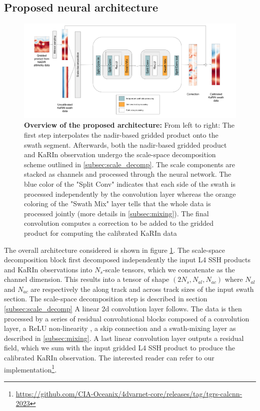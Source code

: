 \begin{bibunit}
\subsection{Proposed neural architecture}
\label{subsec:neural_arch}
\noindent
\begin{figure}
    \begin{center}
	    \includegraphics[width=\textwidth]{00_Calib/CalDiag2.png}
    \end{center}
    \caption{\textbf{Overview of the proposed architecture:} From left to right: The first step interpolates the nadir-based gridded product onto the swath segment. Afterwards, both the nadir-based gridded product and KaRIn observation undergo the scale-space decomposition scheme outlined in \ref{subsec:scale_decomp}. The scale components are stacked as channels and processed through the neural network. The blue color of the "Split Conv" indicates that each side of the swath is processed independently by the convolution layer whereas the orange coloring of the "Swath Mix" layer tells that the whole data is processed jointly (more details in \ref{subsec:mixing}). The final convolution computes a correction to be added to the gridded product for computing the calibrated KaRIn data}
    \label{fig:arch}	
\end{figure}
The overall architecture considered is shown in figure \ref{fig:arch}. The scale-space decomposition block first decomposed independently the input L4 SSH products and KaRIn observations
into $N_s$-scale tensors, which we concatenate as the channel dimension.
This results into a tensor of shape $(2N_s, N_{al}, N_{ac})$ where $N_{al}$ and $N_{ac}$ are respectively the along track and across track sizes of the input swath section. The scale-space decomposition step is described in section \ref{subsec:scale_decomp}
A linear 2{\sc d} convolution layer follows. 
The data is then processed by a series of residual convolutional blocks composed of a convolution layer, a ReLU non-linearity \cite{Nair_Hinton_2019}, a skip connection and a swath-mixing layer as described in \ref{subsec:mixing}. A last linear convolution layer outputs a residual field, which we sum with the input gridded L4 SSH product to produce the calibrated KaRIn observation.
The interested reader can refer to our implementation\footnote{\url{https://github.com/CIA-Oceanix/4dvarnet-core/releases/tag/tgrs-calcnn-2023}}.




\end{bibunit}
